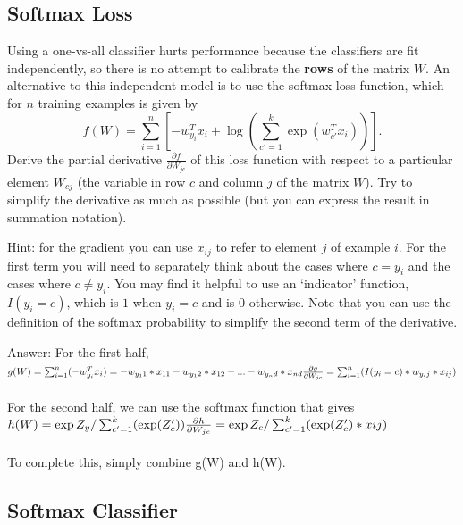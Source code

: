 \documentclass{article}
\def\ans#1{\par\gre{Answer: #1}}
\def\blu#1{{\color{blu}#1}}
\def\gre#1{{\color{gre}#1}}
\begin{document}
\pagebreak

\subsection{Softmax Loss}

Using a one-vs-all classifier hurts performance because the classifiers are fit independently, so there is no attempt to calibrate the \textbf{rows} of the matrix $W$. An alternative to this independent model is to use the softmax loss function, which for $n$ training examples is given by
\[
f(W) = \sum_{i=1}^n \left[-w_{y_i}^Tx_i + \log\left(\sum_{c' = 1}^k \exp(w_{c'}^Tx_i)\right)\right].
\]
\blu{Derive the partial derivative $\frac{\partial f}{\partial W_{jc}}$ of this loss function with respect to a particular element $W_{cj}$ (the variable in row $c$ and column $j$ of the matrix $W$)}. Try to simplify the derivative as much as possible (but you can express the result in summation notation).

Hint: for the gradient you can use $x_{ij}$ to refer to element $j$ of example $i$. For the first term you will need to separately think about the cases where $c=y_i$ and the cases where $c\neq y_i$. You may find it helpful to use an `indicator' function, $I(y_i = c)$, which is $1$ when $y_i = c$ and is $0$ otherwise. Note that you can use the definition of the softmax probability to simplify the second term of the derivative.

\ans{For the first half, \\
$g(W) = \sum_{i=1}^n (-w_{y_i}^Tx_i) = -w_{y_11} * x_{11} - w_{y_12} * x_{12} - ... - w_{y_nd} * x_{nd} \\
\\
\frac{\partial g}{\partial W_{jc}} =  \sum_{i=1}^n  (I(y_i = c) * w_{y_ij} * x_{ij})$ \\
\\
For the second half, we can use the softmax function that gives \\
$h(W) = \exp{Z_y} / \sum_{c'=1}^k (\exp(Z_c')) \\
\frac{\partial h}{\partial W_{jc}} = \exp{Z_c} / \sum_{c'=1}^k (\exp(Z_c') * xij)$ \\
\\
To complete this, simply combine g(W) and h(W).
}
\pagebreak

\subsection{Softmax Classifier}
\end{document}
